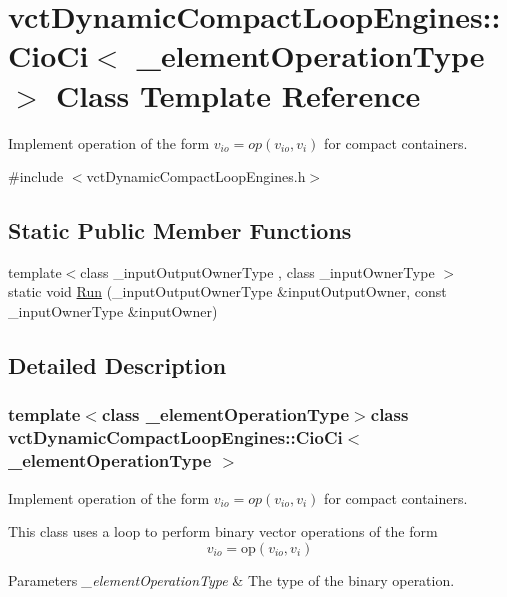 \hypertarget{classvct_dynamic_compact_loop_engines_1_1_cio_ci}{\section{vct\-Dynamic\-Compact\-Loop\-Engines\-:\-:Cio\-Ci$<$ \-\_\-element\-Operation\-Type $>$ Class Template Reference}
\label{classvct_dynamic_compact_loop_engines_1_1_cio_ci}
}


Implement operation of the form $v_{io} = op(v_{io}, v_i)$ for compact containers.  




{\ttfamily \#include $<$vct\-Dynamic\-Compact\-Loop\-Engines.\-h$>$}

\subsection*{Static Public Member Functions}
\begin{DoxyCompactItemize}
\item 
{\footnotesize template$<$class \-\_\-input\-Output\-Owner\-Type , class \-\_\-input\-Owner\-Type $>$ }\\static void \hyperlink{classvct_dynamic_compact_loop_engines_1_1_cio_ci_a65c0346a54f6732d72f9476a428f6d2c}{Run} (\-\_\-input\-Output\-Owner\-Type \&input\-Output\-Owner, const \-\_\-input\-Owner\-Type \&input\-Owner)
\end{DoxyCompactItemize}


\subsection{Detailed Description}
\subsubsection*{template$<$class \-\_\-element\-Operation\-Type$>$class vct\-Dynamic\-Compact\-Loop\-Engines\-::\-Cio\-Ci$<$ \-\_\-element\-Operation\-Type $>$}

Implement operation of the form $v_{io} = op(v_{io}, v_i)$ for compact containers. 

This class uses a loop to perform binary vector operations of the form \[ v_{io} = \mathrm{op}(v_{io}, v_{i}) \]


\begin{DoxyParams}{Parameters}
{\em \-\_\-element\-Operation\-Type} & The type of the binary operation. \\
\hline
\end{DoxyParams}


